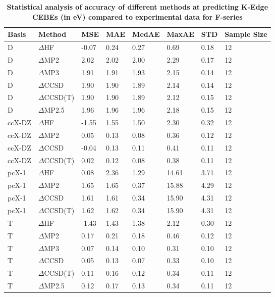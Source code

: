 \begin{table}
  \caption{\textbf{Statistical analysis of accuracy of different methods at predicting K-Edge CEBEs (in eV) compared to experimental data for F-series}}
  \label{tbl:method-summary-f}
  \begin{tabular}{l l l l l l l l }
    \toprule
    \textbf{Basis} & \textbf{Method} & \textbf{MSE} & \textbf{MAE} & \textbf{MedAE} & \textbf{MaxAE} & \textbf{STD} & \textbf{Sample Size} \\ 
    \midrule
    D & $\Delta$HF & -0.07 & 0.24 & 0.27 & 0.69 & 0.18 & 12 \\ 
    D & $\Delta$MP2 & 2.02 & 2.02 & 2.00 & 2.29 & 0.17 & 12 \\ 
    D & $\Delta$MP3 & 1.91 & 1.91 & 1.93 & 2.15 & 0.14 & 12 \\ 
    D & $\Delta$CCSD & 1.90 & 1.90 & 1.89 & 2.14 & 0.14 & 12 \\ 
    D & $\Delta$CCSD(T) & 1.90 & 1.90 & 1.89 & 2.12 & 0.15 & 12 \\ 
    D & $\Delta$MP2.5 & 1.96 & 1.96 & 1.96 & 2.18 & 0.15 & 12 \\ 
    ccX-DZ & $\Delta$HF & -1.55 & 1.55 & 1.50 & 2.30 & 0.32 & 12 \\ 
    ccX-DZ & $\Delta$MP2 & 0.05 & 0.13 & 0.08 & 0.36 & 0.12 & 12 \\ 
    ccX-DZ & $\Delta$CCSD & -0.04 & 0.13 & 0.11 & 0.41 & 0.11 & 12 \\ 
    ccX-DZ & $\Delta$CCSD(T) & 0.02 & 0.12 & 0.08 & 0.38 & 0.11 & 12 \\ 
    pcX-1 & $\Delta$HF & 0.08 & 2.36 & 1.29 & 14.61 & 3.71 & 12 \\ 
    pcX-1 & $\Delta$MP2 & 1.65 & 1.65 & 0.37 & 15.88 & 4.29 & 12 \\ 
    pcX-1 & $\Delta$CCSD & 1.61 & 1.61 & 0.34 & 15.90 & 4.31 & 12 \\ 
    pcX-1 & $\Delta$CCSD(T) & 1.62 & 1.62 & 0.34 & 15.90 & 4.31 & 12 \\ 
    T & $\Delta$HF & -1.43 & 1.43 & 1.38 & 2.12 & 0.30 & 12 \\ 
    T & $\Delta$MP2 & 0.17 & 0.21 & 0.18 & 0.46 & 0.12 & 12 \\ 
    T & $\Delta$MP3 & 0.07 & 0.14 & 0.10 & 0.31 & 0.10 & 12 \\ 
    T & $\Delta$CCSD & 0.05 & 0.13 & 0.07 & 0.33 & 0.10 & 12 \\ 
    T & $\Delta$CCSD(T) & 0.11 & 0.16 & 0.12 & 0.34 & 0.11 & 12 \\ 
    T & $\Delta$MP2.5 & 0.12 & 0.17 & 0.13 & 0.34 & 0.11 & 12 \\ 

\end{tabular}
\end{table}
